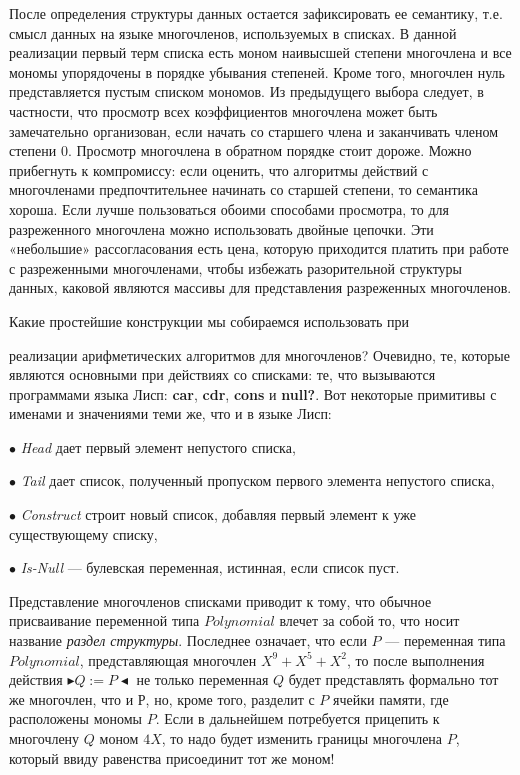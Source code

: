 \documentclass{../../template/mai_book}
\begin{document}
После определения структуры данных остается зафиксировать ее семантику, т.е. смысл данных на языке многочленов, используемых в списках. В данной реализации первый терм списка есть моном наивысшей степени многочлена и все мономы упорядочены в порядке убывания степеней. Кроме того, многочлен нуль представляется пустым списком мономов. Из предыдущего выбора следует, в частности, что просмотр всех коэффициентов многочлена может быть замечательно организован, если начать со старшего члена и заканчивать членом степени 0. Просмотр многочлена в обратном порядке стоит дороже. Можно прибегнуть к компромиссу: если оценить, что алгоритмы действий с многочленами предпочтительнее начинать со старшей степени, то семантика хороша. Если лучше пользоваться обоими способами просмотра, то для разреженного многочлена можно использовать двойные цепочки. Эти «небольшие» рассогласования есть цена, которую приходится платить при работе с разреженными многочленами, чтобы избежать разорительной структуры данных, каковой являются массивы для представления разреженных многочленов.

Какие простейшие конструкции мы собираемся использовать при

\newpage


\noindent
реализации арифметических алгоритмов для многочленов? Очевидно, те, которые являются основными при действиях со списками: те, что вызываются программами языка Лисп: \textbf{car}, \textbf{cdr}, \textbf{cons} и \textbf{null?}. Вот некоторые примитивы с именами и значениями теми же, что и в языке Лисп:

$\bullet$ \textit{Head} дает первый элемент непустого списка,

$\bullet$ \textit{Tail} дает список, полученный пропуском первого элемента 
непустого списка,

$\bullet$ \textit{Construct} строит новый список, добавляя первый элемент к уже существующему списку,

$\bullet$ \textit{Is-Null} — булевская переменная, истинная, если список пуст.

Представление многочленов списками приводит к тому, что обычное присваивание переменной типа $Polynomial$ влечет за собой то, что носит название \textit{раздел структуры}. Последнее означает, что если $P$ — переменная типа $Polynomial$, представляющая многочлен $X^9 + X^5 + X^2$, то после выполнения действия $\blacktriangleright Q := P \blacktriangleleft$ не только переменная $Q$ будет представлять формально тот же многочлен, что и Р, но, кроме того, разделит с $P$ ячейки памяти, где расположены мономы $P$. Если в дальнейшем потребуется прицепить к многочлену $Q$ моном $4X$, то надо будет изменить границы многочлена $P$, который ввиду равенства присоединит тот же моном!
\end{document}

